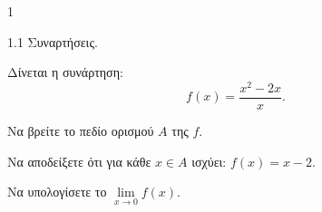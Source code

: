 \begin{ylh}{1}
    \item 1.1 Συναρτήσεις.
\end{ylh}
Δίνεται η συνάρτηση: \[f(x) = \frac{x^2-2x}{x}.\]
\begin{alist}
    \item Να βρείτε το πεδίο ορισμού $Α$ της $f$. 
    \item Να αποδείξετε ότι για κάθε $x \in A$ ισχύει: $f(x) = x - 2$. 
    \item Να υπολογίσετε το $\lim\limits_{x\to0} f(x)$. 
\end{alist}

